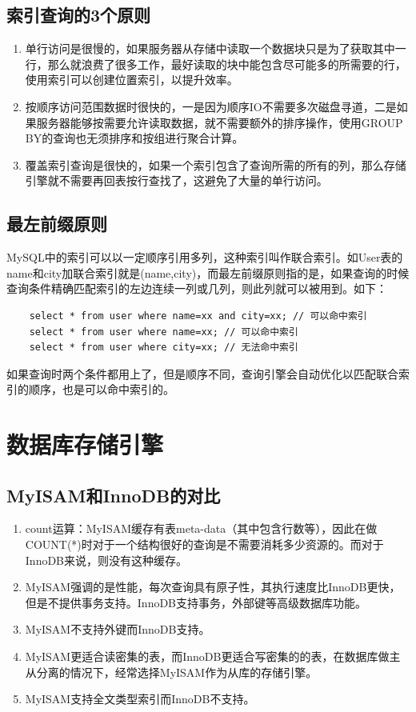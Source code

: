 \documentclass[main.tex]{subfiles}
\begin{document}
\subsection{索引查询的3个原则}
\begin{enumerate}
    \item 单行访问是很慢的，如果服务器从存储中读取一个数据块只是为了获取其中一行，那么就浪费了很多工作，最好读取的块中能包含尽可能多的所需要的行，使用索引可以创建位置索引，以提升效率。
    \item 按顺序访问范围数据时很快的，一是因为顺序IO不需要多次磁盘寻道，二是如果服务器能够按需要允许读取数据，就不需要额外的排序操作，使用GROUP BY的查询也无须排序和按组进行聚合计算。
    \item 覆盖索引查询是很快的，如果一个索引包含了查询所需的所有的列，那么存储引擎就不需要再回表按行查找了，这避免了大量的单行访问。
\end{enumerate}

\subsection{最左前缀原则}
MySQL中的索引可以以一定顺序引用多列，这种索引叫作联合索引。如User表的name和city加联合索引就是(name,city)，而最左前缀原则指的是，如果查询的时候查询条件精确匹配索引的左边连续一列或几列，则此列就可以被用到。如下：
\begin{verbatim}
    select * from user where name=xx and city=xx; // 可以命中索引
    select * from user where name=xx; // 可以命中索引
    select * from user where city=xx; // 无法命中索引
\end{verbatim}
如果查询时两个条件都用上了，但是顺序不同，查询引擎会自动优化以匹配联合索引的顺序，也是可以命中索引的。

\section{数据库存储引擎}
\subsection{MyISAM和InnoDB的对比}
\begin{enumerate}
    \item count运算：MyISAM缓存有表meta-data（其中包含行数等），因此在做COUNT(*)时对于一个结构很好的查询是不需要消耗多少资源的。而对于InnoDB来说，则没有这种缓存。
    \item MyISAM强调的是性能，每次查询具有原子性，其执行速度比InnoDB更快，但是不提供事务支持。InnoDB支持事务，外部键等高级数据库功能。
    \item MyISAM不支持外键而InnoDB支持。
    \item MyISAM更适合读密集的表，而InnoDB更适合写密集的的表，在数据库做主从分离的情况下，经常选择MyISAM作为从库的存储引擎。
    \item MyISAM支持全文类型索引而InnoDB不支持。
\end{enumerate}
\end{document}
